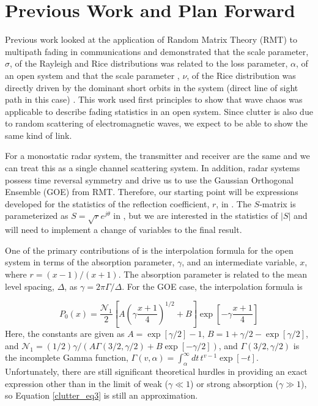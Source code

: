 \documentclass[12pt,twoside]{paper}
\begin{document}
\section{Previous Work and Plan Forward}
Previous work looked at the application of Random Matrix Theory (RMT)  to multipath fading in communications and demonstrated that the scale parameter, $\sigma$, of the Rayleigh and Rice distributions was related to the loss parameter, $\alpha$, of an open system and that the scale parameter , $\nu$, of the Rice distribution was directly driven by the dominant short orbits in the system (direct line of sight path in this case) \cite{yeh_fading} \cite{yeh_first_principles}. This work used first principles to show that wave chaos was applicable to describe fading statistics in an open system. Since clutter is also due to random scattering of electromagnetic waves, we expect to be able to show the same kind of link.

For a monostatic radar system, the transmitter and receiver are the same and we can treat this as a single channel scattering system. In addition, radar systems possess time reversal symmetry and drive us to use the Gaussian Orthogonal Ensemble (GOE) from RMT. Therefore, our starting point will be expressions developed for the statistics of the reflection coefficient, $r$, in \cite{fyodorov_statistics}. The $S$-matrix is parameterized as $S=\sqrt{r}e^{j\theta}$ in \cite{fyodorov_statistics}, but we are interested in the statistics of $|S|$ and will need to implement a change of variables to the final result.

One of the primary contributions of \cite{fyodorov_statistics} is the interpolation formula for the open system in terms of the absorption parameter, $\gamma$, and an intermediate variable, $x$, where $r = (x-1)/(x+1)$. The absorption parameter is related to the mean level spacing, $\Delta$, as $\gamma = 2\pi\Gamma/\Delta$. For the GOE case, the interpolation formula is

\begin{equation}
\label{clutter_eq3}
P_0(x) = \frac{\mathcal{N}_1}{2}\left[ A\left(\gamma\frac{x+1}{4} \right)^{1/2} +B \right]\exp\left[-\gamma\frac{x+1}{4} \right]
\end{equation}
Here, the constants are given as $A = \exp[\gamma/2]-1$, $B=1+\gamma/2 - \exp[\gamma/2]$, and $\mathcal{N}_1 = (1/2)\gamma/(A\Gamma(3/2,\gamma/2)+B\exp[-\gamma/2] )$, and $\Gamma(3/2,\gamma/2)$ is the incomplete Gamma function, $\Gamma(v,\alpha) = \int_{\alpha}^{\infty}dt \, t^{v-1}\exp[-t]$. Unfortunately, there are still significant theoretical hurdles in providing an exact expression other than in the limit of weak ($\gamma \ll 1$) or strong absorption ($\gamma \gg 1$), so Equation \ref{clutter_eq3} is still an approximation.
\end{document}
